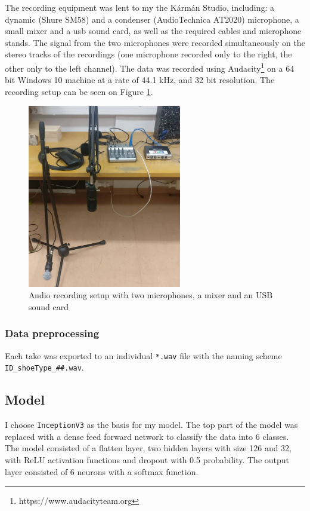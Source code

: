 \documentclass{article}
\begin{document}
The recording equipment was lent to my the Kármán Studio, including: a dynamic (Shure SM58) and a condenser (AudioTechnica AT2020)
microphone, a small mixer and a usb sound card, as well as the required cables and microphone stands. The signal from the two microphones were recorded simultaneously on the stereo tracks of the recordings (one microphone recorded only to the right, the other only to the left channel). The data was recorded using Audacity\footnote{https://www.audacityteam.org} on a 64 bit Windows 10 machine at a rate of 44.1 kHz, and 32 bit resolution. The recording setup can be seen on Figure \ref{fig:rec_setup}.

\begin{figure}[ht]
  \centering
  \includegraphics[width=0.6\textwidth]{img/recording_setup}
  \caption{Audio recording setup with two microphones, a mixer and an USB sound card}
  \label{fig:rec_setup}
\end{figure}

\subsubsection{Data preprocessing}
Each take was exported to an individual \verb+*.wav+ file with the naming scheme \verb+ID_shoeType_##.wav+.

\subsection{Model}
I choose \verb+InceptionV3+ as the basis for my model. The top part of the model was replaced with a dense feed forward network to classify the data into 6 classes. The model consisted of a flatten layer, two hidden layers with size 126 and 32, with ReLU activation functions and dropout with 0.5 probability. The output layer consisted of 6 neurons with a softmax function.
\end{document}
